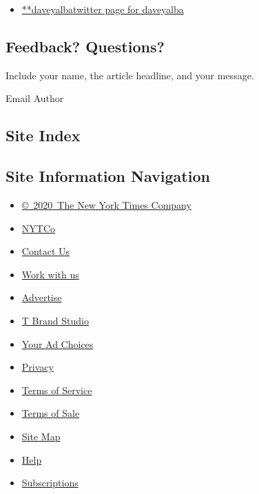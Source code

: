 \begin{itemize}
\tightlist
\item
  \href{https://twitter.com/daveyalba}{**daveyalbatwitter page for
  daveyalba}
\end{itemize}

\hypertarget{feedback-questions}{%
\subsection{Feedback? Questions?}\label{feedback-questions}}

Include your name, the article headline, and your message.

Email Author

\hypertarget{site-index}{%
\subsection{Site Index}\label{site-index}}

\hypertarget{site-information-navigation}{%
\subsection{Site Information
Navigation}\label{site-information-navigation}}

\begin{itemize}
\tightlist
\item
  \href{https://help.nytimes3xbfgragh.onion/hc/en-us/articles/115014792127-Copyright-notice}{©~2020~The
  New York Times Company}
\end{itemize}

\begin{itemize}
\tightlist
\item
  \href{https://www.nytco.com/}{NYTCo}
\item
  \href{https://help.nytimes3xbfgragh.onion/hc/en-us/articles/115015385887-Contact-Us}{Contact
  Us}
\item
  \href{https://www.nytco.com/careers/}{Work with us}
\item
  \href{https://nytmediakit.com/}{Advertise}
\item
  \href{http://www.tbrandstudio.com/}{T Brand Studio}
\item
  \href{https://www.nytimes3xbfgragh.onion/privacy/cookie-policy\#how-do-i-manage-trackers}{Your
  Ad Choices}
\item
  \href{https://www.nytimes3xbfgragh.onion/privacy}{Privacy}
\item
  \href{https://help.nytimes3xbfgragh.onion/hc/en-us/articles/115014893428-Terms-of-service}{Terms
  of Service}
\item
  \href{https://help.nytimes3xbfgragh.onion/hc/en-us/articles/115014893968-Terms-of-sale}{Terms
  of Sale}
\item
  \href{https://spiderbites.nytimes3xbfgragh.onion}{Site Map}
\item
  \href{https://help.nytimes3xbfgragh.onion/hc/en-us}{Help}
\item
  \href{https://www.nytimes3xbfgragh.onion/subscription?campaignId=37WXW}{Subscriptions}
\end{itemize}
